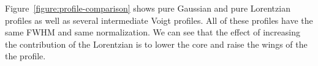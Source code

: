 Figure~\ref{figure:profile-comparison} shows pure Gaussian and pure Lorentzian profiles as well as several intermediate Voigt profiles. All of these profiles have the same FWHM and same normalization. We can see that the effect of increasing the contribution of the Lorentzian is to lower the core and raise the wings of the the profile.


%
%
%
%
